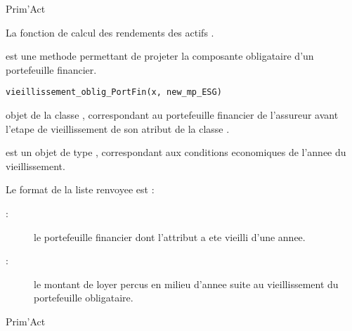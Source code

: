 \documentclass[a4paper]{book}
\begin{document}
%
\begin{Author}\relax
Prim'Act
\end{Author}
%
\begin{SeeAlso}\relax
La fonction de calcul des rendements des actifs .
\end{SeeAlso}
%
\begin{Description}\relax
{} est une methode permettant de projeter la composante obligataire d'un portefeuille financier.
\end{Description}
%
\begin{Usage}
\begin{verbatim}
vieillissement_oblig_PortFin(x, new_mp_ESG)
\end{verbatim}
\end{Usage}
%
\begin{Arguments}
\begin{ldescription}
\item[\code{x}] objet de la classe , correspondant au portefeuille financier de l'assureur avant l'etape de vieillissement de son atribut  de la classe .

\item[\code{new\_mp\_ESG}] est un objet de type , correspondant aux conditions economiques de l'annee du vieillissement.
\end{ldescription}
\end{Arguments}
%
\begin{Value}
Le format de la liste renvoyee est :
\begin{description}

\item[ : ] le portefeuille financier dont l'attribut  a ete vieilli d'une annee.
\item[ : ] le montant de loyer percus en milieu d'annee suite au vieillissement du portefeuille obligataire.

\end{description}

\end{Value}
%
\begin{Author}\relax
Prim'Act
\end{Author}
\end{document}
